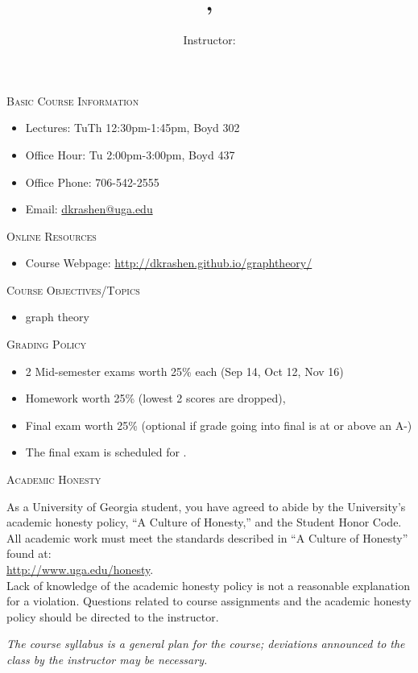 \documentclass[12pt]{amsart}
\title{\course, \semester}
\author{Instructor: \instructor}
\makeatletter
\newcommand{\schedule}{
Lectures: TuTh 12:30pm-1:45pm, Boyd 302
}
\newcommand{\officehour}{Office Hour: Tu 2:00pm-3:00pm, Boyd 437}
\newcommand{\phone}{706-542-2555}
\newcommand{\emailaddr}{dkrashen@uga.edu}
\newcommand{\website}{http://dkrashen.github.io/graphtheory/}
\makeatother
\begin{document}
\maketitle


\thispagestyle{empty}
\noindent
\textsc{Basic Course Information}

\begin{itemize}
\item
\schedule
\item 
\officehour
\item
Office Phone: \phone
\item
Email: \url{\emailaddr}
\end{itemize}

\medskip

\noindent
\textsc{Online Resources}

\begin{itemize}
\item
Course Webpage:  
\url{\website} 
\end{itemize}

\medskip

\noindent
\textsc{Course Objectives/Topics}

\begin{itemize}
\item graph theory
\end{itemize}

\medskip

\noindent
\textsc{Grading Policy}

\begin{itemize}
\item
2 Mid-semester exams worth 25\% each (Sep 14, Oct 12, Nov 16)
\item
Homework worth 25\% (lowest 2 scores are dropped), 
\item
Final exam worth 25\% (optional if grade going into final is at or above an
A-)
\end{itemize}

\smallskip
\begin{itemize}
\item The final exam is scheduled for .
\end{itemize}

\medskip

\noindent
\textsc{Academic Honesty}

As a University of Georgia student, you have agreed to abide by the
University’s academic honesty policy, ``A Culture of Honesty,'' and the
Student Honor Code.  All academic work must meet the standards described in
``A Culture of Honesty'' found at: 
\\ \url{http://www.uga.edu/honesty}.  
\\
Lack
of knowledge of the academic honesty policy is not a reasonable explanation
for a violation.  Questions related to course assignments and the academic
honesty policy should be directed to the instructor.



\smallskip

\textit{The course syllabus is a general plan for the course; deviations
announced to the class by the instructor may be necessary.}
\end{document}
